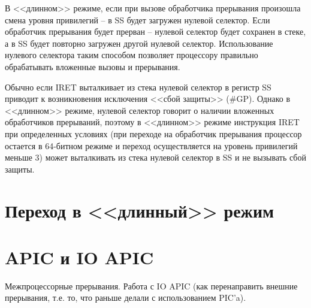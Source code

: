 В <<длинном>> режиме, если при вызове обработчика прерывания произошла смена
уровня привилегий -- в SS будет загружен нулевой селектор. Если обработчик
прерывания будет прерван -- нулевой селектор будет сохранен в стеке, а в SS
будет повторно загружен другой нулевой селектор. Использование нулевого
селектора таким способом позволяет процессору правильно обрабатывать вложенные
вызовы и прерывания.

Обычно если IRET выталкивает из стека нулевой селектор в регистр SS приводит к
возникновения исключения <<сбой защиты>> (\#GP). Однако в <<длинном>> режиме,
нулевой селектор говорит о наличии вложенных обработчиков прерываний, поэтому
в <<длинном>> режиме инструкция IRET при определенных условиях (при переходе
на обработчик прерывания процессор остается в 64-битном режиме и переход
осуществляется на уровень привилегий меньше 3) может
выталкивать из стека нулевой селектор в SS и не вызывать сбой защиты.

\section{Переход в <<длинный>> режим}

\section{APIC и IO APIC}
Межпроцессорные прерывания. Работа с IO APIC (как перенаправить внешние
прерывания, т.е. то, что раньше делали с использованием PIC'a).
